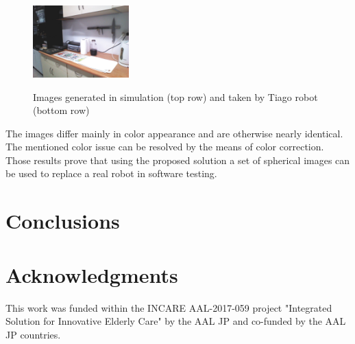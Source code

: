\documentclass{svproc}
\begin{document}
\begin{figure}[!ht]
    \includegraphics[width=0.33\textwidth]{img/sim_vs_tiago/tia_kuchnia_blat.jpg}\\
    \caption{Images generated in simulation (top row) and taken by Tiago robot (bottom row)}
    \label{fig:sim_vs_tiago}
\end{figure}

The images differ mainly in color appearance and are otherwise nearly identical.
The mentioned color issue can be resolved by the means of color correction.
Those results prove that using the proposed solution a set of spherical images can be used to replace a real robot in software testing.

\section{Conclusions}


\section*{Acknowledgments}
\label{sec:acknowledgments}
This work was funded within the INCARE AAL-2017-059 project "Integrated Solution for Innovative Elderly
Care" by the AAL JP and co-funded by the AAL JP countries.



\end{document}
